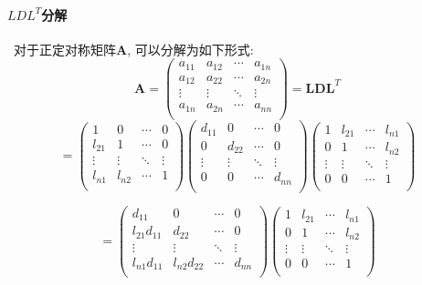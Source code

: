 \documentclass{article}
\begin{document}
\begin{CJK*}{UTF8}{song}
			\paragraph{$LDL^T$分解}\
				对于正定对称矩阵$\mathbf{A}$, 可以分解为如下形式:
				$$\mathbf{A} = 
					\left(
						\begin{matrix}
							a_{11} & a_{12} & \cdots & a_{1n} \\
							a_{12} & a_{22} & \cdots & a_{2n} \\
							\vdots & \vdots & \ddots & \vdots \\
							a_{1n} & a_{2n} & \cdots & a_{nn} \\
						\end{matrix}
					\right) = \mathbf{LDL}^{T}$$
				$$ = \left(
				\begin{matrix}
					1 & 0 & \cdots & 0 \\
					l_{21} & 1 & \cdots & 0 \\
					\vdots & \vdots & \ddots & \vdots \\
					l_{n1} & l_{n2} & \cdots & 1 \\
				\end{matrix}
				\right)
				\left(
				\begin{matrix}
				d_{11} & 0 & \cdots & 0 \\
				0 & d_{22} & \cdots & 0 \\
				\vdots & \vdots & \ddots & \vdots \\
				0 & 0 & \cdots & d_{nn} \\
				\end{matrix}
				\right)
				\left(
				\begin{matrix}
				1 & l_{21} & \cdots & l_{n1} \\
				0 & 1 & \cdots & l_{n2} \\
				\vdots & \vdots & \ddots & \vdots \\
				0 & 0 & \cdots & 1 \\
				\end{matrix}
				\right)
				 $$
				 
				 $$ = 
				 \left(
				 \begin{matrix}
				 d_{11} & 0 & \cdots & 0 \\
				 l_{21}d_{11} & d_{22} & \cdots & 0 \\
				 \vdots & \vdots & \ddots & \vdots \\
				 l_{n1}d_{11} & l_{n2}d_{22} & \cdots & d_{nn} \\
				 \end{matrix}
				 \right)
				 \left(
				 \begin{matrix}
				 1 & l_{21} & \cdots & l_{n1} \\
				 0 & 1 & \cdots & l_{n2} \\
				 \vdots & \vdots & \ddots & \vdots \\
				 0 & 0 & \cdots & 1 \\
				 \end{matrix}
				 \right)
				 $$
				 

\end{CJK*}
\end{document}
